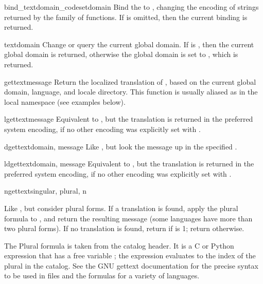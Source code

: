 \begin{funcdesc}{bind_textdomain_codeset}{domain}
Bind the  to , changing the encoding of
strings returned by the  family of functions.
If  is omitted, then the current binding is returned.

\end{funcdesc}

\begin{funcdesc}{textdomain}{}
Change or query the current global domain.  If  is
, then the current global domain is returned, otherwise the
global domain is set to , which is returned.
\end{funcdesc}

\begin{funcdesc}{gettext}{message}
Return the localized translation of , based on the
current global domain, language, and locale directory.  This function
is usually aliased as \function{_} in the local namespace (see
examples below).
\end{funcdesc}

\begin{funcdesc}{lgettext}{message}
Equivalent to , but the translation is returned
in the preferred system encoding, if no other encoding was explicitly
set with .

\end{funcdesc}

\begin{funcdesc}{dgettext}{domain, message}
Like , but look the message up in the specified
.
\end{funcdesc}

\begin{funcdesc}{ldgettext}{domain, message}
Equivalent to , but the translation is returned
in the preferred system encoding, if no other encoding was explicitly
set with .

\end{funcdesc}

\begin{funcdesc}{ngettext}{singular, plural, n}

Like , but consider plural forms. If a translation
is found, apply the plural formula to , and return the
resulting message (some languages have more than two plural forms).
If no translation is found, return  if  is 1;
return  otherwise.

The Plural formula is taken from the catalog header. It is a C or
Python expression that has a free variable ; the expression evaluates
to the index of the plural in the catalog. See the GNU gettext
documentation for the precise syntax to be used in  files and the
formulas for a variety of languages.


\end{funcdesc}

